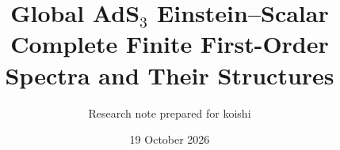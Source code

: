 
\title{\textbf{Global AdS$_3$ Einstein--Scalar}\\[5pt]
\large Complete Finite First-Order Spectra and Their Structures}
\author{Research note prepared for koishi}
\date{19 October 2026}
\maketitle
